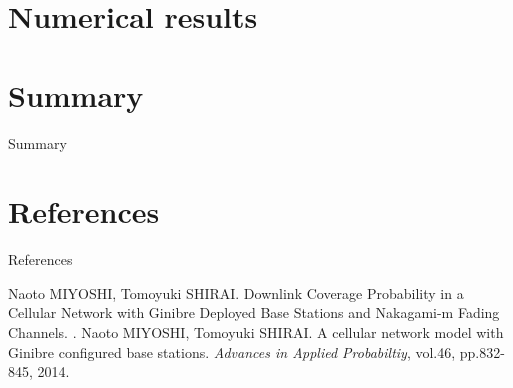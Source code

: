 \documentclass{beamer}
\begin{document}
\section{Numerical results}
\begin{frame}{1}
\end{frame}

\section{Summary}
\begin{frame}{Summary}
\end{frame}

\section{References}
\begin{frame}{References}
  
  \begin{thebibliography}{9}
   Naoto MIYOSHI, Tomoyuki SHIRAI.
   \newblock Downlink Coverage Probability in a Cellular Network with Ginibre Deployed Base Stations and Nakagami-m Fading Channels.
   .
   Naoto MIYOSHI, Tomoyuki SHIRAI.
    \newblock A cellular network model with Ginibre configured base stations.
    \newblock \emph{Advances in Applied Probabiltiy}, vol.46, pp.832-845, 2014.
    
  \end{thebibliography}
\end{frame}
\end{document}
